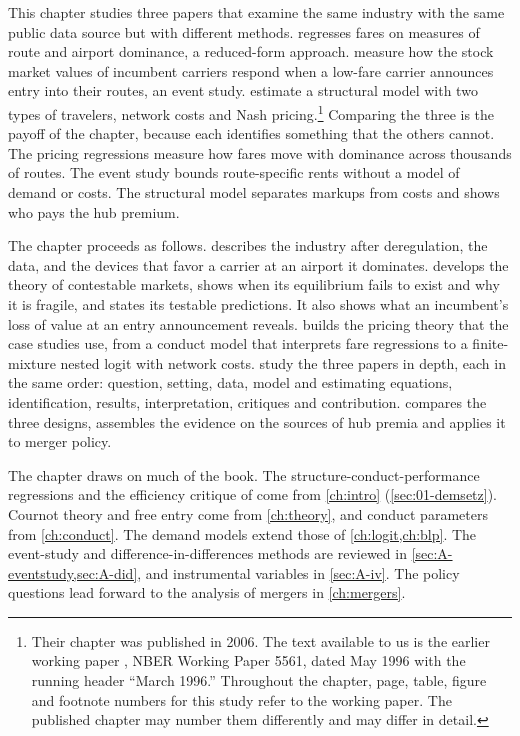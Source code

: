 This chapter studies three papers that examine the same industry with the same public data source but with
different methods. \citet{Borenstein1989} regresses fares on measures of route and airport dominance, a
reduced-form approach. \citet{WhinstonCollins1992} measure how the stock market values of incumbent carriers
respond when a low-fare carrier announces entry into their routes, an event study.
\citet{BerryCarnallSpiller2006} estimate a structural model with two types of travelers, network costs and
Nash pricing.\footnote{Their chapter was published in 2006. The text available to us is the earlier working
paper \citep{BerryCarnallSpiller1996}, NBER Working Paper 5561, dated May 1996 with the running header
``March 1996.'' Throughout the chapter, page, table, figure and footnote numbers for this study refer to the
working paper. The published chapter may number them differently and may differ in detail.} Comparing the
three is the payoff of the chapter, because each identifies something that the others cannot. The pricing
regressions measure how fares move with dominance across thousands of routes. The event study bounds
route-specific rents without a model of demand or costs. The structural model separates markups from costs
and shows who pays the hub premium.

The chapter proceeds as follows.  describes the industry after deregulation, the
data, and the devices that favor a carrier at an airport it dominates.  develops the
theory of contestable markets, shows when its equilibrium fails to exist and why it is fragile, and states
its testable predictions. It also shows what an incumbent's loss of value
at an entry announcement reveals.  builds the pricing theory that the case studies
use, from a conduct model that interprets fare regressions to a finite-mixture nested logit with network
costs.  study the three papers in depth, each in the same
order: question, setting, data, model and estimating equations, identification, results, interpretation,
critiques and contribution.  compares the three designs, assembles the evidence on
the sources of hub premia and applies it to merger policy.

The chapter draws on much of the book. The structure-conduct-performance regressions and the efficiency
critique of \citet{Demsetz1973} come from \cref{ch:intro} (\cref{sec:01-demsetz}). Cournot theory and free
entry come from \cref{ch:theory}, and conduct parameters from \cref{ch:conduct}. The demand models extend
those of \cref{ch:logit,ch:blp}. The event-study and difference-in-differences methods are reviewed in
\cref{sec:A-eventstudy,sec:A-did}, and instrumental variables in \cref{sec:A-iv}. The policy questions lead forward to the analysis of mergers in \cref{ch:mergers}.

